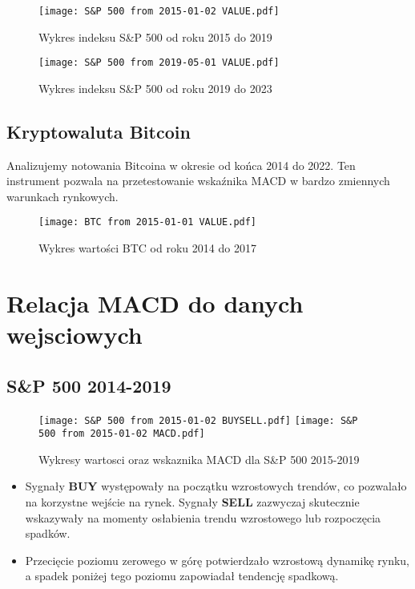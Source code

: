 \documentclass[12pt, letterpaper]{article}
\begin{document}
\begin{figure}[h!]
    \centering
    \texttt{[image: S\&P 500 from 2015-01-02 VALUE.pdf]}
    \caption{Wykres indeksu S\&P 500 od roku 2015 do 2019}
    \texttt{[image: S\&P 500 from 2019-05-01 VALUE.pdf]}
    \caption{Wykres indeksu S\&P 500 od roku 2019 do 2023}
    \label{fig:sp500}
\end{figure}
\vspace{10cm}  
\subsection{Kryptowaluta Bitcoin}
Analizujemy notowania Bitcoina w okresie od końca 2014 do 2022. Ten instrument pozwala na przetestowanie wskaźnika MACD w bardzo zmiennych warunkach rynkowych.

\begin{figure}[h!]
    \centering
    \texttt{[image: BTC from 2015-01-01 VALUE.pdf]}
    \caption{Wykres wartości BTC od roku 2014 do 2017}
    \label{fig:btc_2014_2017}
\end{figure}

\section{Relacja MACD do danych wejsciowych}

\subsection{S\&P 500 2014-2019}
\begin{figure}[h!]
    \centering
    \texttt{[image: S\&P 500 from 2015-01-02 BUYSELL.pdf]}
    \texttt{[image: S\&P 500 from 2015-01-02 MACD.pdf]}
    \caption{Wykresy wartosci oraz wskaznika MACD dla S\&P 500 2015-2019}
    \label{fig:sp500_2014_2017}
\end{figure}

\begin{itemize}
\item Sygnały \textbf{BUY} występowały na początku wzrostowych trendów, co pozwalało na korzystne wejście na rynek. Sygnały \textbf{SELL} zazwyczaj skutecznie wskazywały na momenty osłabienia trendu wzrostowego lub rozpoczęcia spadków.
\item Przecięcie poziomu zerowego w górę potwierdzało wzrostową dynamikę rynku, a spadek poniżej tego poziomu zapowiadał tendencję spadkową.
\end{itemize}
\vspace{10cm}  
\end{document}
